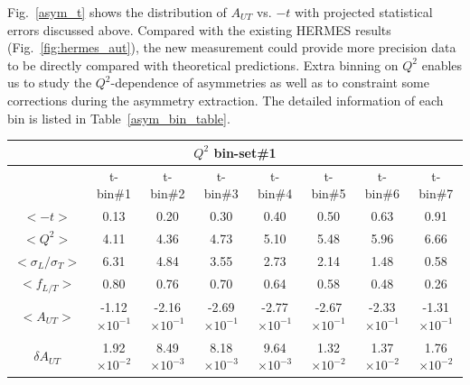 Fig.~\ref{asym_t} shows the distribution of $A_{UT}$ vs. $-t$ with projected
statistical errors discussed above. Compared with the existing HERMES results
(Fig.~\ref{fig:hermes_aut}), the new measurement could provide more precision
data to be directly compared with theoretical predictions. Extra binning on
$Q^{2}$ enables us to study the $Q^{2}$-dependence of asymmetries as well as to
constraint some corrections during the asymmetry extraction.  The detailed
information of each bin is listed in Table~\ref{asym_bin_table}.  
\begin{table}[!ht]
\centering
 \small
\begin{tabular}{|c|c|c|c|c|c|c|c|}
\hline
 \multicolumn{8}{|c|}{$Q^{2}$ bin-set\#1 } \\
\hline
      &  t-bin\#1 & t-bin\#2 & t-bin\#3 & t-bin\#4 & t-bin\#5 & t-bin\#6 & t-bin\#7 \\
  \hline
$<-t>$    &  0.13 &  0.20 & 0.30 & 0.40 & 0.50 & 0.63 & 0.91 \\
$<Q^{2}>$   &  4.11 &  4.36 & 4.73 & 5.10 & 5.48 & 5.96 & 6.66 \\
$<\sigma_{L}/\sigma_{T}>$    &  6.31 &  4.84 & 3.55 & 2.73 & 2.14 & 1.48 & 0.58 \\
$<f_{L/T}>$   &  0.80 &  0.76 & 0.70 & 0.64 & 0.58 & 0.48 & 0.26 \\
$<A_{UT}>$ &  -1.12$\times 10^{-1}$ &  -2.16$\times 10^{-1}$ & -2.69$\times 10^{-1}$ & -2.77$\times 10^{-1}$ & -2.67$\times 10^{-1}$ & -2.33$\times 10^{-1}$ & -1.31$\times 10^{-1}$ \\
$\delta A_{UT}$  &  1.92$\times 10^{-2}$ &  8.49$\times 10^{-3}$ & 8.18$\times 10^{-3}$ & 9.64$\times 10^{-3}$ & 1.32$\times 10^{-2}$ & 1.37$\times 10^{-2}$ & 1.76$\times 10^{-2}$ \\
\hline


\end{tabular}
\end{table}
